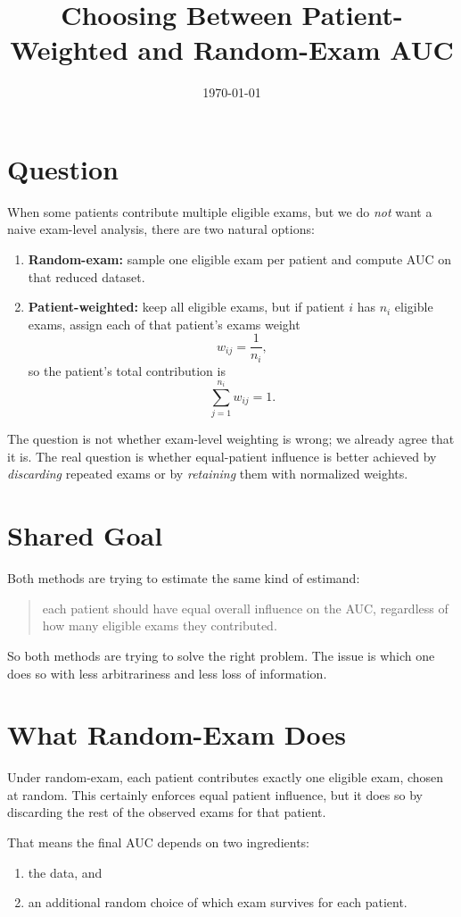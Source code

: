 \documentclass[11pt]{article}
\title{Choosing Between Patient-Weighted and Random-Exam AUC}
\author{}
\date{\today}
\begin{document}
\maketitle

\section*{Question}
When some patients contribute multiple eligible exams, but we do \emph{not} want a naive exam-level analysis, there are two natural options:
\begin{enumerate}[leftmargin=2em]
\item \textbf{Random-exam:} sample one eligible exam per patient and compute AUC on that reduced dataset.
\item \textbf{Patient-weighted:} keep all eligible exams, but if patient $i$ has $n_i$ eligible exams, assign each of that patient's exams weight
\[
w_{ij} = \frac{1}{n_i},
\]
so the patient's total contribution is
\[
\sum_{j=1}^{n_i} w_{ij} = 1.
\]
\end{enumerate}

The question is not whether exam-level weighting is wrong; we already agree that it is. The real question is whether equal-patient influence is better achieved by \emph{discarding} repeated exams or by \emph{retaining} them with normalized weights.

\section*{Shared Goal}
Both methods are trying to estimate the same kind of estimand:
\begin{quote}
each patient should have equal overall influence on the AUC, regardless of how many eligible exams they contributed.
\end{quote}
So both methods are trying to solve the right problem. The issue is which one does so with less arbitrariness and less loss of information.

\section*{What Random-Exam Does}
Under random-exam, each patient contributes exactly one eligible exam, chosen at random. This certainly enforces equal patient influence, but it does so by discarding the rest of the observed exams for that patient.

That means the final AUC depends on two ingredients:
\begin{enumerate}[leftmargin=2em]
\item the data, and
\item an additional random choice of which exam survives for each patient.
\end{enumerate}
\end{document}
